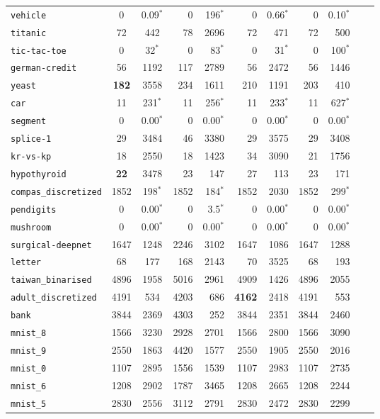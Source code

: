 \begin{tabular}{lccrrrrrrrr}
\texttt{vehicle} & 0 & 0.09$^*$ & 0 & 196$^*$ & 0 & 0.66$^*$ & 0 & 0.10$^*$\\
\texttt{titanic} & 72 & 442 & 78 & 2696 & 72 & 471 & 72 & 500\\
\texttt{tic-tac-toe} & 0 & 32$^*$ & 0 & 83$^*$ & 0 & 31$^*$ & 0 & 100$^*$\\
\texttt{german-credit} & 56 & 1192 & 117 & 2789 & 56 & 2472 & 56 & 1446\\
\texttt{yeast} & \textbf{182} & 3558 & 234 & 1611 & 210 & 1191 & 203 & 410\\
\texttt{car} & 11 & 231$^*$ & 11 & 256$^*$ & 11 & 233$^*$ & 11 & 627$^*$\\
\texttt{segment} & 0 & 0.00$^*$ & 0 & 0.00$^*$ & 0 & 0.00$^*$ & 0 & 0.00$^*$\\
\texttt{splice-1} & 29 & 3484 & 46 & 3380 & 29 & 3575 & 29 & 3408\\
\texttt{kr-vs-kp} & 18 & 2550 & 18 & 1423 & 34 & 3090 & 21 & 1756\\
\texttt{hypothyroid} & \textbf{22} & 3478 & 23 & 147 & 27 & 113 & 23 & 171\\
\texttt{compas\_discretized} & 1852 & 198$^*$ & 1852 & 184$^*$ & 1852 & 2030 & 1852 & 299$^*$\\
\texttt{pendigits} & 0 & 0.00$^*$ & 0 & 3.5$^*$ & 0 & 0.00$^*$ & 0 & 0.00$^*$\\
\texttt{mushroom} & 0 & 0.00$^*$ & 0 & 0.00$^*$ & 0 & 0.00$^*$ & 0 & 0.00$^*$\\
\texttt{surgical-deepnet} & 1647 & 1248 & 2246 & 3102 & 1647 & 1086 & 1647 & 1288\\
\texttt{letter} & 68 & 177 & 168 & 2143 & 70 & 3525 & 68 & 193\\
\texttt{taiwan\_binarised} & 4896 & 1958 & 5016 & 2961 & 4909 & 1426 & 4896 & 2055\\
\texttt{adult\_discretized} & 4191 & 534 & 4203 & 686 & \textbf{4162} & 2418 & 4191 & 553\\
\texttt{bank} & 3844 & 2369 & 4303 & 252 & 3844 & 2351 & 3844 & 2460\\
\texttt{mnist\_8} & 1566 & 3230 & 2928 & 2701 & 1566 & 2800 & 1566 & 3090\\
\texttt{mnist\_9} & 2550 & 1863 & 4420 & 1577 & 2550 & 1905 & 2550 & 2016\\
\texttt{mnist\_0} & 1107 & 2895 & 1556 & 1539 & 1107 & 2983 & 1107 & 2735\\
\texttt{mnist\_6} & 1208 & 2902 & 1787 & 3465 & 1208 & 2665 & 1208 & 2244\\
\texttt{mnist\_5} & 2830 & 2556 & 3112 & 2791 & 2830 & 2472 & 2830 & 2299\\

\end{tabular}
